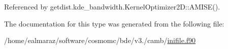 Referenced by getdist.\+kde\+\_\+bandwidth.\+Kernel\+Optimizer2\+D\+::\+A\+M\+I\+S\+E().



The documentation for this type was generated from the following file\+:\begin{DoxyCompactItemize}
\item 
/home/ealmaraz/software/cosmomc/bde/v3./camb/\mbox{\hyperlink{inifile_8f90}{inifile.\+f90}}\end{DoxyCompactItemize}
